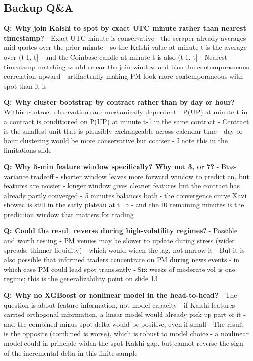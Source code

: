 \documentclass[
]{article}
\begin{document}
\subsection{Backup Q\&A}\label{backup-qa}

\textbf{Q: Why join Kalshi to spot by exact UTC minute rather than
nearest timestamp?} - Exact UTC minute is conservative - the scraper
already averages mid-quotes over the prior minute - so the Kalshi value
at minute t is the average over (t-1, t{]} - and the Coinbase candle at
minute t is also (t-1, t{]} - Nearest-timestamp matching would smear the
join window and bias the contemporaneous correlation upward -
artifactually making PM look more contemporaneous with spot than it is

\textbf{Q: Why cluster bootstrap by contract rather than by day or
hour?} - Within-contract observations are mechanically dependent - P(UP)
at minute t in a contract is conditioned on P(UP) at minute t-1 in the
same contract - Contract is the smallest unit that is plausibly
exchangeable across calendar time - day or hour clustering would be more
conservative but coarser - I note this in the limitations slide

\textbf{Q: Why 5-min feature window specifically? Why not 3, or 7?} -
Bias-variance tradeoff - shorter window leaves more forward window to
predict on, but features are noisier - longer window gives cleaner
features but the contract has already partly converged - 5 minutes
balances both - the convergence curve Xavi showed is still in the early
plateau at t=5 - and the 10 remaining minutes is the prediction window
that matters for trading

\textbf{Q: Could the result reverse during high-volatility regimes?} -
Possible and worth testing - PM venues may be slower to update during
stress (wider spreads, thinner liquidity) - which would widen the lag,
not narrow it - But it is also possible that informed traders
concentrate on PM during news events - in which case PM could lead spot
transiently - Six weeks of moderate vol is one regime; this is the
generalizability point on slide 13

\textbf{Q: Why no XGBoost or nonlinear model in the head-to-head?} - The
question is about feature information, not model capacity - if Kalshi
features carried orthogonal information, a linear model would already
pick up part of it - and the combined-minus-spot delta would be
positive, even if small - The result is the opposite (combined is
worse), which is robust to model choice - a nonlinear model could in
principle widen the spot-Kalshi gap, but cannot reverse the sign of the
incremental delta in this finite sample
\end{document}
